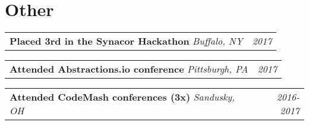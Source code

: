 \documentclass[letterpaper,11pt]{article}
\makeatletter
\newenvironment{other}[3]
{
  \begin{tabular*}{\textwidth}{l@{\extracolsep{\fill}}r}
    \large{\textbf{#1}} \textit{#2} & \textit{#3}
  \end{tabular*}
}
\makeatother
\begin{document}
\section{Other}
\begin{other}{Placed 3rd in the Synacor Hackathon} {Buffalo, NY}    {2017}\end{other}
\begin{other}{Attended Abstractions.io conference} {Pittsburgh, PA} {2017}\end{other}
\begin{other}{Attended CodeMash conferences (3x)}  {Sandusky, OH}   {2016-2017}\end{other}
\end{document}
